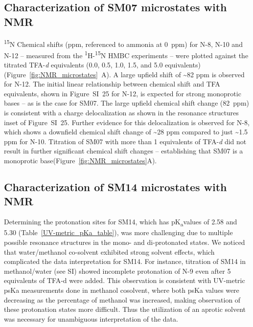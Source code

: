 \documentclass[9pt,lineno]{elife}
\newcommand{\pKa}{pK\textsubscript{a}}
\begin{document}
\subsection{Characterization of SM07 microstates with NMR}

\textsuperscript{15}N Chemical shifts (ppm, referenced to ammonia at 0~ppm) for N-8, N-10 and N-12 – measured from the \textsuperscript{1}H-\textsuperscript{15}N HMBC experiments – were plotted against the titrated TFA-\textit{d} equivalents (0.0, 0.5, 1.0, 1.5, and 5.0 equivalents)(Figure~\ref{fig:NMR_microstates}~A). A large upfield shift of \textasciitilde82 ppm is observed for N-12. The initial linear relationship between chemical shift and TFA equivalents, shown in Figure~SI~25 for N-12, is expected for strong monoprotic bases – as is the case for SM07. The large upfield chemical shift change (82~ppm) is consistent with a charge delocalization as shown in the resonance structures inset of Figure~SI~25. Further evidence for this delocalization is observed for N-8, which shows a downfield chemical shift change of \textasciitilde28 ppm compared to just \textasciitilde1.5 ppm for N-10. Titration of SM07 with more than 1 equivalents of TFA-\textit{d} did not result in further significant chemical shift changes – establishing that SM07 is a monoprotic base(Figure~\ref{fig:NMR_microstates}A).

\subsection{Characterization of SM14 microstates with NMR}

Determining the protonation sites for SM14, which has \pKa values of 2.58 and 5.30 (Table~\ref{UV-metric_pKa_table}), was more challenging due to multiple possible resonance structures in the mono- and di-protonated states. We noticed that water/methanol co-solvent exhibited strong solvent effects, which complicated the data interpretation for SM14. For instance, titration of SM14 in methanol/water (see SI) showed incomplete protonation of N-9 even after 5 equivalents of TFA-d were added. This observation is consistent with UV-metric psKa measurements done in methanol cosolvent, where both psKa values were decreasing as the percentage of methanol was increased, making observation of these protonation states more difficult. Thus the utilization of an aprotic solvent was necessary for unambiguous interpretation of the data.
\end{document}
